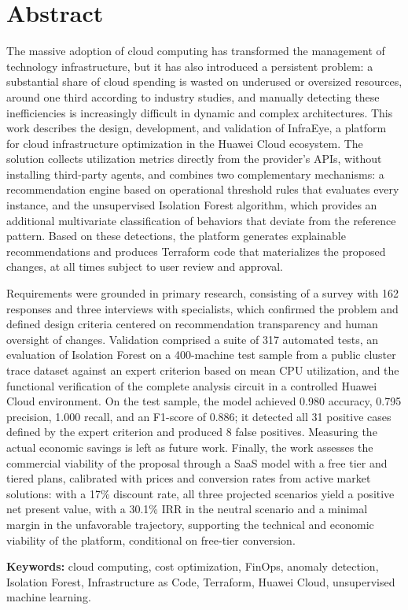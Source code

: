 \chapter*{Abstract}
{}

The massive adoption of cloud computing has transformed the management of technology infrastructure, but it has also introduced a persistent problem: a substantial share of cloud spending is wasted on underused or oversized resources, around one third according to industry studies, and manually detecting these inefficiencies is increasingly difficult in dynamic and complex architectures. This work describes the design, development, and validation of InfraEye, a platform for cloud infrastructure optimization in the Huawei Cloud ecosystem. The solution collects utilization metrics directly from the provider's APIs, without installing third-party agents, and combines two complementary mechanisms: a recommendation engine based on operational threshold rules that evaluates every instance, and the unsupervised Isolation Forest algorithm, which provides an additional multivariate classification of behaviors that deviate from the reference pattern. Based on these detections, the platform generates explainable recommendations and produces Terraform code that materializes the proposed changes, at all times subject to user review and approval.

Requirements were grounded in primary research, consisting of a survey with 162 responses and three interviews with specialists, which confirmed the problem and defined design criteria centered on recommendation transparency and human oversight of changes. Validation comprised a suite of 317 automated tests, an evaluation of Isolation Forest on a 400-machine test sample from a public cluster trace dataset against an expert criterion based on mean CPU utilization, and the functional verification of the complete analysis circuit in a controlled Huawei Cloud environment. On the test sample, the model achieved 0.980 accuracy, 0.795 precision, 1.000 recall, and an F1-score of 0.886; it detected all 31 positive cases defined by the expert criterion and produced 8 false positives. Measuring the actual economic savings is left as future work. Finally, the work assesses the commercial viability of the proposal through a SaaS model with a free tier and tiered plans, calibrated with prices and conversion rates from active market solutions: with a 17\% discount rate, all three projected scenarios yield a positive net present value, with a 30.1\% IRR in the neutral scenario and a minimal margin in the unfavorable trajectory, supporting the technical and economic viability of the platform, conditional on free-tier conversion.

\vspace{1cm}

\noindent\textbf{Keywords:} cloud computing, cost optimization, FinOps, anomaly detection, Isolation Forest, Infrastructure as Code, Terraform, Huawei Cloud, unsupervised machine learning.
